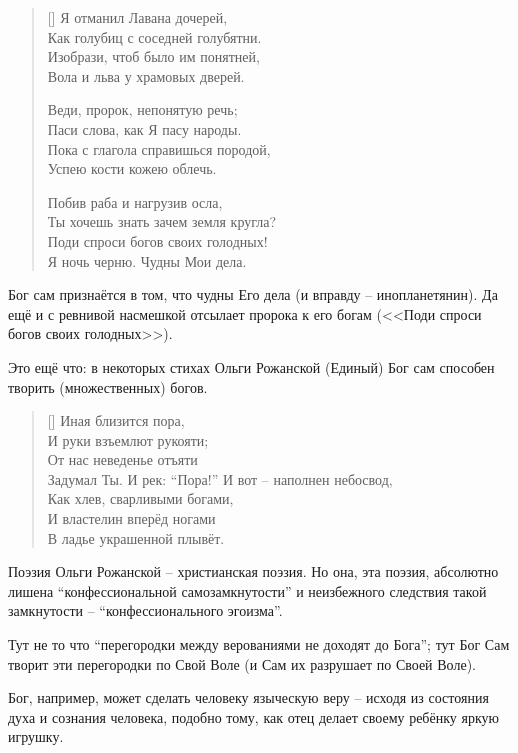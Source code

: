 \documentclass[12pt,a5paper,twoside]{article}
\begin{document}
\settowidth{\versewidth}{Я отманил Лавана дочерей,}
\begin{verse}[\versewidth]
Я отманил Лавана дочерей,\\
Как голубиц с соседней голубятни.\\
Изобрази, чтоб было им понятней,\\
Вола и льва у храмовых дверей.

Веди, пророк, непонятую речь;\\
Паси слова, как Я пасу народы.\\
Пока с глагола справишься породой,\\
Успею кости кожею облечь.

Побив раба и нагрузив осла,\\
Ты хочешь знать зачем земля кругла?\\
Поди спроси богов своих голодных!\\
Я ночь черню. Чудны Мои дела.
\end{verse}

Бог сам признаётся в том, что чудны Его дела 
(и вправду -- инопланетянин). Да ещё и с ревнивой насмешкой отсылает пророка 
к его богам (<<Поди спроси богов своих голодных>>).

Это ещё что: в некоторых стихах Ольги Рожанской (Единый) Бог сам способен творить (множественных) богов.

\settowidth{\versewidth}{Иная близится пора,}
\begin{verse}[\versewidth]
Иная близится пора,\\
И руки взъемлют рукояти;\\
От нас неведенье отъяти\\
Задумал Ты. И рек: ``Пора!''
\newpage
И вот -- наполнен небосвод,\\
Как хлев, сварливыми богами,\\
И властелин вперёд ногами\\
В ладье украшенной плывёт.
\end{verse}

Поэзия Ольги Рожанской -- христианская поэзия. Но она, эта поэзия, 
абсолютно лишена ``конфессиональной самозамкнутости'' и неизбежного следствия такой замкнутости -- ``конфессионального эгоизма''.

Тут не то что ``перегородки между верованиями не доходят до Бога''; 
тут Бог Сам творит эти перегородки по Свой Воле (и Сам их разрушает по Своей Воле).

Бог, например, может сделать человеку языческую веру -- исходя из состояния духа и сознания человека, 
подобно тому, как отец делает своему ребёнку яркую игрушку.
\end{document}
